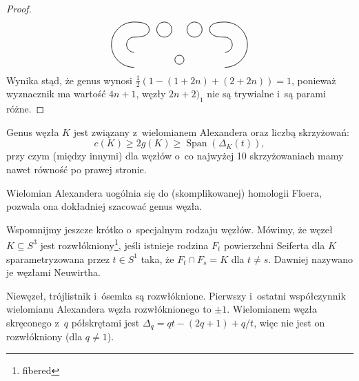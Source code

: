 \begin{proof}
\[\begin{tikzpicture}[baseline=-0.65ex,scale=0.055]
            \draw[semithick] (0,-10) circle (3);

            \draw[semithick] (-30, 15) to [out=left, in=up]   (-45, 0);
            \draw[semithick] (-30,-15) to [out=left, in=down] (-45, 0);
            \draw[semithick] (-30,  5) to [out=left, in=up]   (-35, 0);
            \draw[semithick] (-30, -5) to [out=left, in=down] (-35, 0);

            \draw[semithick] (30, 15) to [out=right, in=up]   (45,0);
            \draw[semithick] (30,-15) to [out=right, in=down] (45,0);
            \draw[semithick] (30,  5) to [out=right, in=up]   (35,0);
            \draw[semithick] (30, -5) to [out=right, in=down] (35,0);

            \draw[semithick] (-30, 15) to [out=right, in=up] (-20,10);
            \draw[semithick] (-30,  5) to [out=right, in=down] (-20,10);

            \draw[semithick] (30, 15) to [out=left, in=up] (20,10);
            \draw[semithick] (30,  5) to [out=left, in=down] (20,10);

            \draw[semithick] (-10, 10) circle (5);
            \draw[semithick] (10,  10) circle (5);
        \end{tikzpicture}
    \]
    Wynika stąd, że genus wynosi $\frac 12 (1 - (1+2n) + (2+2n)) = 1$, ponieważ wyznacznik ma wartość $4n+1$,
    węzły $2n+2)_1$ nie są trywialne i~są parami różne.
\end{proof}

\begin{proposition}
    Genus węzła $K$ jest związany z~wielomianem Alexandera oraz liczbą skrzyżowań:
    \[
        c(K) \ge 2 g(K) \ge \operatorname{Span}(\Delta_K(t)),
    \]
    przy czym (między innymi) dla węzłów o~co najwyżej 10 skrzyżowaniach mamy nawet równość po prawej stronie.
\end{proposition}

Wielomian Alexandera uogólnia się do (skomplikowanej) homologii Floera, pozwala ona dokładniej szacować genus węzła.

Wspomnijmy jeszcze krótko o~specjalnym rodzaju węzłów.
Mówimy, że węzeł $K \subseteq S^3$ jest rozwłókniony\footnote{fibered}, jeśli istnieje rodzina $F_t$ powierzchni Seiferta dla $K$ sparametryzowana przez $t \in S^1$ taka, że $F_t \cap F_s = K$ dla $t \neq s$.
Dawniej nazywano je węzłami Neuwirtha.

Niewęzeł, trójlistnik i~ósemka są rozwłóknione.
Pierwszy i~ostatni współczynnik wielomianu Alexandera węzła rozwłóknionego to $\pm 1$.
Wielomianem węzła skręconego z~$q$ półskrętami jest $\Delta_q = qt - (2q+1)+q/t$, więc nie jest on rozwłókniony (dla $q \neq 1$).



